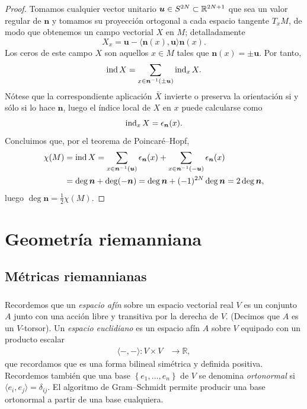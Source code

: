\documentclass[11pt,a4paper]{amsbook}
\theoremstyle{remark} \newtheorem{rmk}[subsection]{Observación}
\theoremstyle{definition} \newtheorem{defn}[subsection]{Definición}
\theoremstyle{definition} \newtheorem{ex}[subsection]{Ejemplo}
\theoremstyle{definition} \newtheorem{ej}[subsection]{Ejercicio}
\begin{document}
\begin{proof}
  Tomamos cualquier vector unitario $\bm{u}\in S^{2N}\subset \mathbb R^{2N+1}$ que sea un valor regular de $\bm{n}$ y tomamos su proyección ortogonal a cada espacio tangente $T_xM$, de modo que obtenemos un campo vectorial $X$ en $M$; detalladamente
  \begin{equation*}
X_x = \bm{u} - \langle \bm{n}(x),\bm{u} \rangle \bm{n}(x).
  \end{equation*}
  Los ceros de este campo $X$ son aquellos $x\in M$ tales que $\bm{n}(x)=\pm \bm{u}$. Por tanto,
  \begin{equation*}
\operatorname{ind} X = \sum_{x\in \bm{n}^{-1}(\pm \bm{u})} \operatorname{ind}_x X .
  \end{equation*}
 Nótese que la correspondiente aplicación $\bar{X}$ invierte o preserva la orientación si y sólo si lo hace $\bm{n}$, luego el índice local de $X$ en $x$ puede calcularse como
  \begin{equation*}
\operatorname{ind}_x X = \epsilon_{\bm{n}}(x).
  \end{equation*}
  Concluimos que, por el teorema de Poincaré--Hopf,
  \begin{align*}
    \chi(M)&=\operatorname{ind} X =\sum_{x\in \bm{n}^{-1}(\bm{u})} \epsilon_{\bm{n}}(x) + \sum_{x\in \bm{n}^{-1}(-\bm{u})} \epsilon_{\bm{n}}(x) \\
    &= \deg \bm{n} + \deg(-\bm{n})=\deg \bm{n} + (-1)^{2N} \deg \bm{n}=2\deg\bm{n},
  \end{align*}
luego $\deg \bm{n} = \tfrac{1}{2}\chi(M)$.
\end{proof}


\chapter{Geometría riemanniana}
\section{Métricas riemannianas}
\subsection{} Recordemos que un \emph{espacio afín} sobre un espacio vectorial real $V$ es un conjunto $A$ junto con una acción libre y transitiva por la derecha de $V$. (Decimos que $A$ es un $V$-torsor). Un \emph{espacio euclidiano} es un espacio afín $A$ sobre $V$ equipado con un producto escalar
\begin{align*}
  \langle-,-\rangle: V\times V & \longrightarrow \mathbb{R} ,
\end{align*}
que recordamos que es una forma bilineal simétrica y definida positiva. Recordemos también que una base $\left\{ e_1,\dots,e_n \right\}$ de $V$ se denomina \emph{ortonormal} si $\langle e_i, e_j \rangle = \delta_{ij}$. El algoritmo de Gram--Schmidt permite producir una base ortonormal a partir de una base cualquiera.
\end{document}
